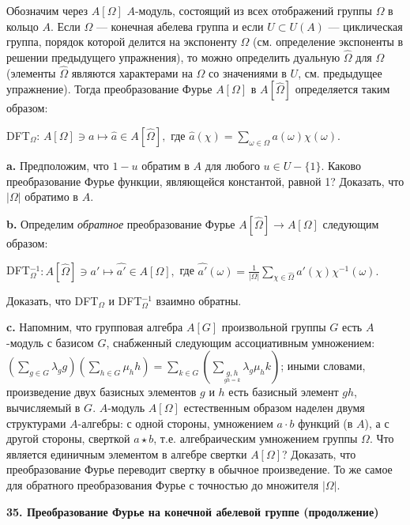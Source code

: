 \documentclass{mai_book}
\begin{document}
\medskip
Обозначим через $A[\Omega]$ $A$-модуль, состоящий из всех отображений группы $\Omega$ в кольцо $A$. Если $\Omega$ --- конечная абелева группа и если $U \subset U(A)$ --- циклическая группа, порядок которой делится на экспоненту $\Omega$ (см. определение экспоненты в решении предыдущего упражнения), то можно определить дуальную $\hat{\Omega}$ для $\Omega$ (элементы $\hat{\Omega}$ являются характерами на $\Omega$ со значениями в $U$, см. предыдущее упражнение). Тогда преобразование Фурье $A[\Omega]$ в $A[\hat{\Omega}]$ определяется таким образом:
\begin{center}
D{\footnotesize FT}$_{\Omega}$: $A[\Omega] \ni a \mapsto \hat{a} \in A[\hat{\Omega}],$ где $\hat{a}(\chi)=\sum_{\omega \in \Omega}a(\omega) \chi(\omega).$ 
\end{center}\par
\textbf{a.} Предположим, что $1-u$ обратим в $A$ для любого $u \in U - \{1\}$. Каково преобразование Фурье функции, являющейся константой, равной 1? Доказать, что $| \Omega |$ обратимо в $A$.\par 
\textbf{b.} Определим \textit{обратное} преобразование Фурье $A[\hat{\Omega}] \to A[\Omega]$ следующим образом:
\begin{center}
D{\footnotesize FT}$_{\Omega}^{-1} : A[\hat{\Omega}] \ni a' \mapsto \hat{a'} \in A[\Omega],$ где $\hat{a'}(\omega)= \frac{1}{| \Omega |} \sum_{\chi \in \hat{\Omega}}a'(\chi) \chi^{-1} (\omega).$
\end{center}
\noindent
Доказать, что D{\footnotesize FT}$_{\Omega}$ и D{\footnotesize FT}$_{\Omega}^{-1}$ взаимно обратны.\par
\textbf{c.} Напомним, что групповая алгебра $A[G]$ произвольной группы $G$ есть $A$-модуль с базисом $G$, снабженный следующим ассоциативным умножением: $(\sum\nolimits_{g \in G} \lambda_gg)(\sum\nolimits_{h \in G} \mu_hh)= \sum\nolimits_{k \in G}(\sum\nolimits_{\underset{gh=k}{g,h}} \lambda_g \mu_h k)$; иными словами, произведение двух базисных элементов $g$ и $h$ есть базисный элемент $gh$, вычисляемый в $G$. $A$-модуль $A[\Omega]$ естественным образом наделен двумя структурами $A$-алгебры: с одной стороны, умножением $a \cdot b$ функций (в $A$), а с другой стороны, сверткой $a \star b$, т.е. алгебраическим умножением группы $\Omega$. Что является единичным элементом в алгебре свертки $A[\Omega]$? Доказать, что преобразование Фурье переводит свертку в обычное произведение. То же самое для обратного преобразования Фурье с точностью до множителя $| \Omega |$.

\medskip
\noindent
\textbf{35. Преобразование Фурье на конечной абелевой группе (продолжение)}
\end{document}
